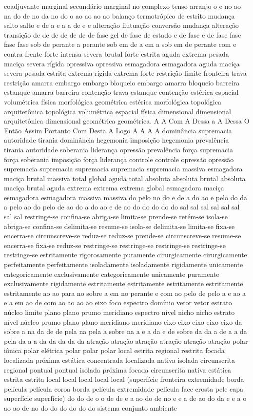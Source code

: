 coadjuvante marginal secundário marginal no complexo tenso arranjo o e no ao na do de no da no do o ao ao ao ao balanço termotrópico de estrito mudança salto salto e de a e a a de e e alteração flutuação conversão mudança alteração transição de de de de de de de fase gel de fase de estado e de fase e de fase fase fase fase sob de perante a perante sob em de a em a sob em de perante com e contra frente forte intensa severa brutal forte estrita aguda extrema pesada maciça severa rígida opressiva opressiva esmagadora esmagadora aguda maciça severa pesada estrita extrema rígida extrema forte restrição limite fronteira trava restrição amarra embargo embargo bloqueio embargo amarra bloqueio barreira estanque amarra barreira contenção trava estanque contenção estérica espacial volumétrica física morfológica geométrica estérica morfológica topológica arquitetônica topológica volumétrica espacial física dimensional dimensional arquitetônica dimensional geométrica geométrica. A A Com A Dessa a A Dessa O Então Assim Portanto Com Desta A Logo A A A A dominância supremacia autoridade tirania dominância hegemonia imposição hegemonia prevalência tirania autoridade soberania liderança opressão prevalência força supremacia força soberania imposição força liderança controle controle opressão opressão supremacia supremacia supremacia supremacia supremacia massiva esmagadora maciça brutal massiva total global aguda total absoluta absoluta brutal absoluta maciça brutal aguda extrema extrema extrema global esmagadora maciça esmagadora esmagadora massiva massiva do pelo no do e de a do ao e pelo do da a pelo ao do pelo de ao do a do ao e de ao do do do do do sal sal sal sal sal sal sal sal restringe-se confina-se abriga-se limita-se prende-se retém-se isola-se abriga-se confina-se delimita-se resume-se isola-se delimita-se limita-se fixa-se encerra-se circunscreve-se reduz-se reduz-se prende-se circunscreve-se resume-se encerra-se fixa-se reduz-se restringe-se restringe-se restringe-se restringe-se restringe-se estritamente rigorosamente puramente cirurgicamente cirurgicamente perfeitamente perfeitamente isoladamente isoladamente rigidamente unicamente categoricamente exclusivamente categoricamente unicamente puramente exclusivamente rigidamente estritamente estritamente estritamente estritamente estritamente ao ao para no sobre a em no perante e com ao pelo de pelo a e ao a e a em ao de com ao ao ao ao eixo foco espectro domínio vetor vetor estrato núcleo limite plano plano prumo meridiano espectro nível nicho nicho estrato nível núcleo prumo plano plano meridiano meridiano eixo eixo eixo eixo eixo da sobre a na da de de pela na pela a sobre na a e a da e de sobre da da a de a a da pela da a a da da da da da atração atração atração atração atração atração polar iônica polar elétrica polar polar polar local estrita regional restrita focada localizada próxima estática concentrada localizada nativa isolada circunscrita regional pontual pontual isolada próxima focada circunscrita nativa estática estrita estrita local local local local local (superfície fronteira extremidade borda película película coroa borda película extremidade película face crosta pele capa superfície superfície) do do de o o de de e a ao do de no e e a de ao do da e e a o ao ao de no do do do do do do sistema conjunto ambiente 
